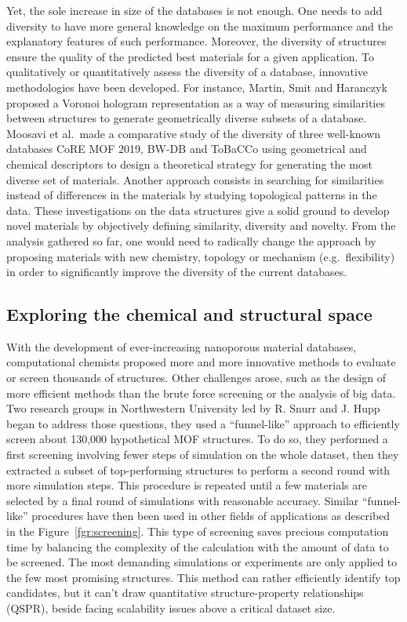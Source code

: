 \documentclass[main.tex]{subfiles}
\begin{document}
Yet, the sole increase in size of the databases is not enough. One needs to add diversity to have more general knowledge on the maximum performance and the explanatory features of such performance. Moreover, the diversity of structures ensure the quality of the predicted best materials for a given application. To qualitatively or quantitatively assess the diversity of a database, innovative methodologies have been developed. For instance, Martin, Smit and Haranczyk proposed a Voronoi hologram representation as a way of measuring similarities between structures to generate geometrically diverse subsets of a database.\autocite{Martin_2011} Moosavi et al.\ made a comparative study of the diversity of three well-known databases CoRE MOF 2019,\autocite{Chung_2019} BW-DB\autocite{Boyd_2016} and ToBaCCo\autocite{Gomez_Gualdron_2016, Colon_2017}  using geometrical and chemical descriptors to design a theoretical strategy for generating the most diverse set of materials.\autocite{Moosavi_2020} Another approach consists in searching for similarities instead of differences in the materials by studying topological patterns in the data.\autocite{Lee_2017} These investigations on the data structures give a solid ground to develop novel materials by objectively defining similarity, diversity and novelty. From the analysis gathered so far, one would need to radically change the approach by proposing materials with new chemistry, topology or mechanism (e.g.\ flexibility) in order to significantly improve the diversity of the current databases.


\subsection{Exploring the chemical and structural space}


With the development of ever-increasing nanoporous material databases, computational chemists proposed more and more innovative methods to evaluate or screen thousands of structures. Other challenges arose, such as the design of more efficient methods than the brute force screening or the analysis of big data. Two research groups in Northwestern University led by R. Snurr and J. Hupp began to address those questions, they used a ``funnel-like'' approach to efficiently screen about 130,000 hypothetical MOF structures.\autocite{Wilmer_2012} To do so, they performed a first screening involving fewer steps of simulation on the whole dataset, then they extracted a subset of top-performing structures to perform a second round with more simulation steps. This procedure is repeated until a few materials are selected by a final round of simulations with reasonable accuracy. Similar ``funnel-like'' procedures have then been used in other fields of applications as described in the Figure~\ref{fgr:screening}. This type of screening saves precious computation time by balancing the complexity of the calculation with the amount of data to be screened. The most demanding simulations or experiments are only applied to the few most promising structures. This method can rather efficiently identify top candidates, but it can't draw quantitative structure-property relationships (QSPR), beside facing scalability issues above a critical dataset size.
\end{document}
